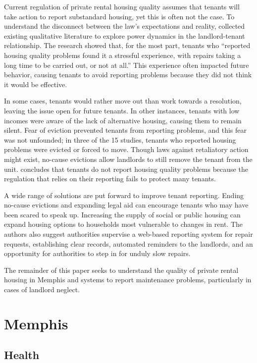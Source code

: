 \documentclass[
]{book}
\begin{document}
Current regulation of private rental housing quality assumes that tenants will take action to report substandard housing, yet this is often not the case. To understand the disconnect between the law's expectations and reality, \citet{chisholm2018} collected existing qualitative literature to explore power dynamics in the landlord-tenant relationship. The research showed that, for the most part, tenants who ``reported housing quality problems found it a stressful experience, with repairs taking a long time to be carried out, or not at all.'' This experience often impacted future behavior, causing tenants to avoid reporting problems because they did not think it would be effective.

In some cases, tenants would rather move out than work towards a resolution, leaving the issue open for future tenants. In other instances, tenants with low incomes were aware of the lack of alternative housing, causing them to remain silent. Fear of eviction prevented tenants from reporting problems, and this fear was not unfounded; in three of the 15 studies, tenants who reported housing problems were evicted or forced to move. Though laws against retaliatory action might exist, no-cause evictions allow landlords to still remove the tenant from the unit. \citet{chisholm2018} concludes that tenants do not report housing quality problems because the regulation that relies on their reporting fails to protect many tenants.

A wide range of solutions are put forward to improve tenant reporting. Ending no-cause evictions and expanding legal aid can encourage tenants who may have been scared to speak up. Increasing the supply of social or public housing can expand housing options to households most vulnerable to changes in rent. The authors also suggest authorities supervise a web-based reporting system for repair requests, establishing clear records, automated reminders to the landlords, and an opportunity for authorities to step in for unduly slow repairs.

The remainder of this paper seeks to understand the quality of private rental housing in Memphis and systems to report maintenance problems, particularly in cases of landlord neglect.

\hypertarget{memphis}{%
\section{Memphis}\label{memphis}}

\hypertarget{health}{%
\subsection{Health}\label{health}}
\end{document}
